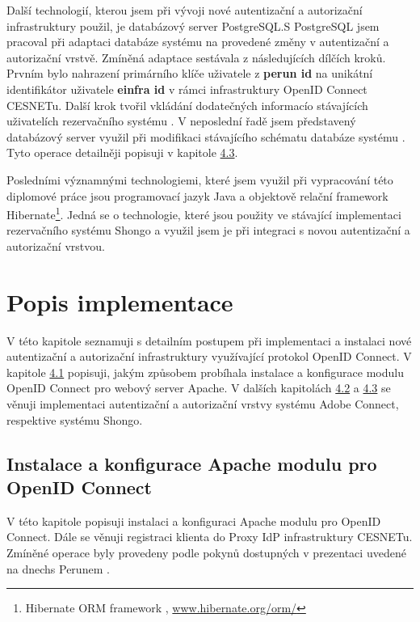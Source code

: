 \documentclass[
  printed, %
  twoside, %
  table,   %
  nolof,     %
  nolot,     %
]{fithesis3}
\begin{document}
\par

Další technologií, kterou jsem při vývoji nové autentizační a autorizační infrastruktury použil, je databázový server PostgreSQL.\break S PostgreSQL jsem pracoval při adaptaci databáze systému  na provedené změny v autentizační a autorizační vrstvě. Zmíněná adaptace sestávala z následujících dílčích kroků. Prvním bylo nahrazení primárního klíče uživatele z \textbf{perun id} na unikátní identifikátor uživatele  \textbf{einfra id} v rámci infrastruktury OpenID Connect CESNETu. Další krok tvořil vkládání dodatečných informací\break o stávajících uživatelích rezervačního systému . V neposlední řadě jsem představený databázový server využil při modifikaci stávajícího schématu databáze systému . Tyto operace detailněji popisuji v kapitole \hyperref[ShongoImpl]{4.3}. 
\par 
Posledními významnými technologiemi, které jsem využil při vypracování této diplomové práce jsou programovací jazyk Java a objektově relační framework Hibernate\footnote{Hibernate ORM framework , \url{www.hibernate.org/orm/}}. Jedná se o technologie, které jsou použity ve stávající implementaci rezervačního systému Shongo a využil jsem je při integraci s novou autentizační a autorizační vrstvou.  


\chapter{Popis implementace}
V této kapitole seznamuji s detailním postupem při implementaci a instalaci nové autentizační a autorizační infrastruktury využívající protokol OpenID Connect. V kapitole \hyperref[apacheConfig]{4.1} popisuji, jakým způsobem probíhala instalace a konfigurace modulu OpenID Connect pro webový server Apache. V dalších kapitolách \hyperref[ACImpl]{4.2} a \hyperref[ShongoImpl]{4.3} se věnuji implementaci autentizační a autorizační vrstvy systému Adobe Connect, respektive systému Shongo.   


\section{Instalace a konfigurace Apache modulu pro OpenID Connect}
\label{apacheInstall}
V této kapitole popisuji instalaci a konfiguraci Apache modulu pro OpenID Connect. Dále se věnuji registraci klienta  do Proxy IdP infrastruktury CESNETu. Zmíněné operace byly provedeny podle pokynů dostupných v prezentaci uvedené na dnech\break s Perunem \cite{oidcConfigPresentation}.
\end{document}
